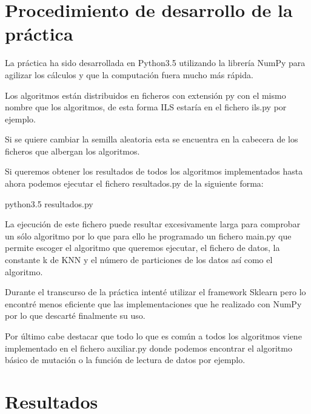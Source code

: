 \documentclass[12pt,a4paper]{article}
\begin{document}
	\newpage

	\section{Procedimiento de desarrollo de la práctica}
	\label{sec:procedimiento}

	La práctica ha sido desarrollada en Python3.5 utilizando la librería NumPy para agilizar los cálculos y que la computación fuera mucho más rápida.
	
	Los algoritmos están distribuidos en ficheros con extensión py con el mismo nombre que los algoritmos, de esta forma ILS estaría en el fichero ils.py por ejemplo.
	
	Si se quiere cambiar la semilla aleatoria esta se encuentra en la cabecera de los ficheros que albergan los algoritmos. 
	
	Si queremos obtener los resultados de todos los algoritmos implementados hasta ahora podemos ejecutar el fichero resultados.py de la siguiente forma:
	
	python3.5 resultados.py
	
	La ejecución de este fichero puede resultar excesivamente larga para comprobar un sólo algoritmo por lo que para ello he programado un fichero main.py que permite escoger el algoritmo que queremos ejecutar, el fichero de datos, la constante k de KNN y el número de particiones de los datos así como el algoritmo.
	
	Durante el transcurso de la práctica intenté utilizar el framework Sklearn pero lo encontré menos eficiente que las implementaciones que he realizado con NumPy por lo que descarté finalmente su uso.
	
	Por último cabe destacar que todo lo que es común a todos los algoritmos viene implementado en el fichero auxiliar.py donde podemos encontrar el algoritmo básico de mutación o la función de lectura de datos por ejemplo.

	\newpage

	\section{Resultados}
	\label{sec:resultados}
\end{document}
